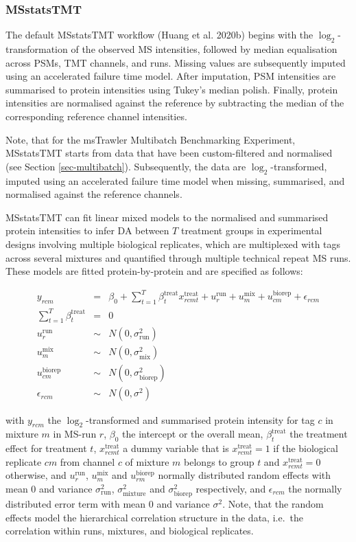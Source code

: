 \documentclass[
  letterpaper,
  DIV=11,
  numbers=noendperiod]{scrartcl}
\begin{document}
\subsubsection{MSstatsTMT}

The default MSstatsTMT workflow (Huang et al. 2020b) begins with the
\(\log_2\)-transformation of the observed MS intensities, followed by
median equalisation across PSMs, TMT channels, and runs. Missing values
are subsequently imputed using an accelerated failure time model. After
imputation, PSM intensities are summarised to protein intensities using
Tukey's median polish. Finally, protein intensities are normalised
against the reference by subtracting the median of the corresponding
reference channel intensities.

Note, that for the msTrawler Multibatch Benchmarking Experiment,
MSstatsTMT starts from data that have been custom-filtered and
normalised (see Section \ref{sec-multibatch}). Subsequently, the data
are \(\log_2\)-transformed, imputed using an accelerated failure time
model when missing, summarised, and normalised against the reference
channels.

MSstatsTMT can fit linear mixed models to the normalised and summarised
protein intensities to infer DA between \(T\) treatment groups in
experimental designs involving multiple biological replicates, which are
multiplexed with tags across several mixtures and quantified through
multiple technical repeat MS runs. These models are fitted
protein-by-protein and are specified as follows:

\[
\begin{array}{lcl}
y_{rcm} &=& \beta_0 + \sum\limits_{t=1}^T\beta^\text{treat}_tx^\text{treat}_{rcmt} + u_r^\text{run} + u_m^\text{mix}  + u_{cm}^\text{biorep} +
\epsilon_{rcm}\\
\sum\limits_{t=1}^T \beta_{t}^\text{treat}&=&0\\
u_r^\text{run}&\sim& N(0,\sigma^2_\text{run})\\
u_m^\text{mix}&\sim& N(0,\sigma^2_\text{mix})\\
u_{cm}^\text{biorep}&\sim& N(0,\sigma^2_\text{biorep})\\
\epsilon_{rcm}  &\sim& N(0,\sigma^2)
\end{array}
\]

with \(y_{rcm}\) the \(\log_2\)-transformed and summarised protein
intensity for tag \(c\) in mixture \(m\) in MS-run \(r\), \(\beta_0\)
the intercept or the overall mean, \(\beta^\text{treat}_t\) the
treatment effect for treatment \(t\), \(x^\text{treat}_{rcmt}\) a dummy
variable that is \(x^\text{treat}_{rcmt}=1\) if the biological replicate
\(cm\) from channel \(c\) of mixture \(m\) belongs to group \(t\) and
\(x^\text{treat}_{rcmt}=0\) otherwise, and \(u_r^\text{run}\),
\(u_m^\text{mix}\) and \(u_{rm}^\text{biorep}\) normally distributed
random effects with mean 0 and variance \(\sigma^2_\text{run}\),
\(\sigma^2_\text{mixture}\) and \(\sigma^2_\text{biorep}\) respectively,
and \(\epsilon_{rcm}\) the normally distributed error term with mean 0
and variance \(\sigma^2\). Note, that the random effects model the
hierarchical correlation structure in the data, i.e.~the correlation
within runs, mixtures, and biological replicates.
\end{document}
